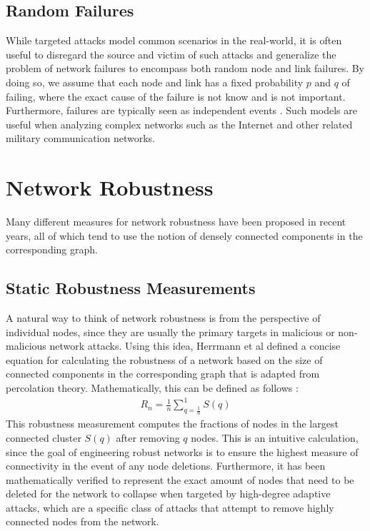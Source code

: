 \documentclass[doc]{apa}%
\begin{document}
\subsection{Random Failures}
\label{RandomFailures}
While targeted attacks model common scenarios in the real-world, it is often useful to disregard the source and victim of such attacks and generalize the problem of network failures to encompass both random node and link failures. By doing so, we assume that each node and link has a fixed probability $p$ and $q$ of failing, where the exact cause of the failure is not know and is not important. Furthermore, failures are typically seen as independent events \cite{RandomStudy}. Such models are useful when analyzing complex networks such as the Internet and other related military communication networks. 

\section{Network Robustness}

Many different measures for network robustness have been proposed in recent years, all of which tend
to use the notion of densely connected components in the corresponding graph. 


\subsection{Static Robustness Measurements}

A natural way to think of network robustness is from the perspective of individual nodes, since they are 
usually the primary targets in malicious or non-malicious network attacks. Using this idea, Herrmann et al
defined a concise equation for calculating the robustness of a network based on the size of connected
components in the corresponding graph that is adapted from percolation theory. Mathematically, this can be defined as follows \cite{Onion}:
\begin{eqnarray}
R_{n} = \frac{1}{n}\sum_{q=\frac{1}{n}}^{1}S(q)
\end{eqnarray}
This robustness measurement computes the fractions of nodes in the largest connected cluster $S(q)$ after removing $q$ nodes. This is an intuitive calculation, since the goal of engineering robust networks is to ensure the highest measure of connectivity in the event of any node deletions. Furthermore, it has been mathematically verified to represent the exact amount of nodes that need to be deleted for the network to collapse when targeted by high-degree adaptive attacks, which are a specific class of attacks that attempt to remove highly connected nodes from the network. 
\end{document}
